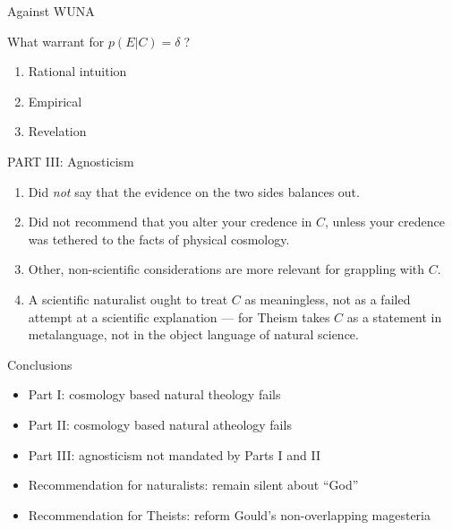 \documentclass{beamer}
\begin{document}
\begin{frame}{Against WUNA}

  What warrant for $p(E|C)=\delta\;$?

\begin{enumerate}
\item Rational intuition
\item Empirical
\item Revelation
\end{enumerate}


\end{frame}


\begin{frame}{PART III: Agnosticism}

\begin{enumerate}
\item Did \emph{not} say that the evidence on the two sides balances
  out.
\item Did not recommend that you alter your credence in $C$, unless
  your credence was tethered to the facts of physical cosmology.
\item Other, non-scientific considerations are more relevant for
  grappling with $C$.
\item A scientific naturalist ought to treat $C$ as meaningless, not
  as a failed attempt at a scientific explanation --- for Theism takes
  $C$ as a statement in metalanguage, not in the object language of
  natural science. \end{enumerate}


\end{frame}

\begin{frame}{Conclusions}

\begin{itemize}
\item Part I: cosmology based natural theology fails
\item Part II: cosmology based natural atheology fails
\item Part III: agnosticism not mandated by Parts I and II
\item Recommendation for naturalists: remain silent about ``God''
\item Recommendation for Theists: reform Gould's non-overlapping
  magesteria
\end{itemize}



\end{frame}
\end{document}
